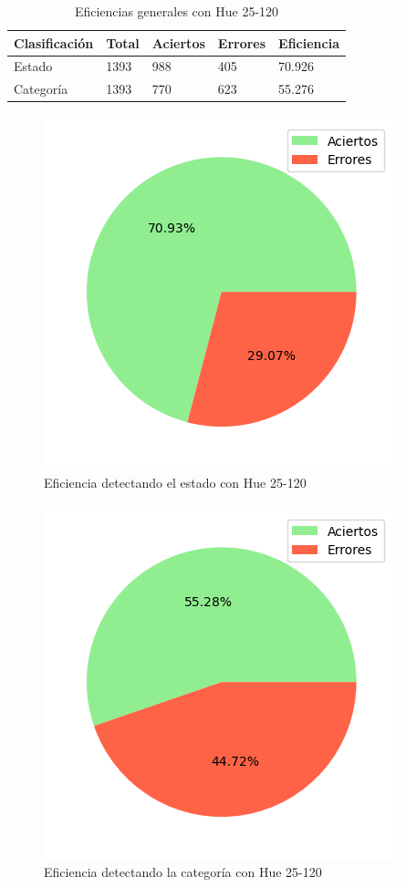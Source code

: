 \begin{table}[H]
\centering
\begin{tabular}{|l|l|l|l|l|}
\hline 
\textbf{Clasificación} & \textbf{Total} & \textbf{Aciertos} & \textbf{Errores} & \textbf{Eficiencia} \\
\hline
Estado & 1393 & 988 & 405 & 70.926 \\
\hline 
Categoría & 1393 & 770 & 623 & 55.276 \\
\hline 
\end{tabular}
\caption{Eficiencias generales con Hue 25-120}
\label{table:efficiency_general_25_120}
\end{table}

\captionsetup[figure]{skip=-10pt}

\begin{figure}[H]
\centering
\includegraphics[scale=0.6]{images/result_global_state_25_120.png}
\caption{Eficiencia detectando el estado con Hue 25-120}
\label{img:efficiency_state_25_120}
\end{figure}

\begin{figure}[H]
\centering
\includegraphics[scale=0.6]{images/result_global_class_25_120.png}
\caption{Eficiencia detectando la categoría con Hue 25-120}
\label{img:efficiency_category_25_120}
\end{figure}

